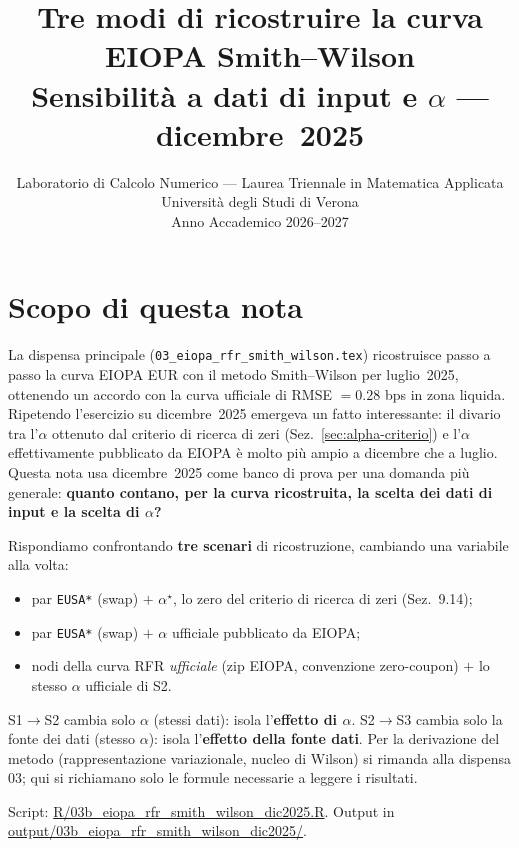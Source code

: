 \documentclass[11pt,a4paper]{article}
\title{%
  \textbf{Tre modi di ricostruire la curva EIOPA Smith--Wilson}\\[6pt]
  \large Sensibilit\`a a dati di input e $\alpha$ --- dicembre~2025\\[4pt]
}
\author{Laboratorio di Calcolo Numerico --- Laurea Triennale in Matematica Applicata\\
  Universit\`a degli Studi di Verona\\[2pt]
  Anno Accademico 2026--2027}
\date{}
\theoremstyle{remark}
\begin{document}
\maketitle

\section{Scopo di questa nota}

La dispensa principale (\texttt{03\_eiopa\_rfr\_smith\_wilson.tex}) ricostruisce passo a
passo la curva EIOPA EUR con il metodo Smith--Wilson per luglio~2025, ottenendo un accordo
con la curva ufficiale di RMSE $=0.28$ bps in zona liquida. Ripetendo l'esercizio su
dicembre~2025 emergeva un fatto interessante: il divario tra l'$\alpha$ ottenuto dal criterio
di ricerca di zeri (Sez.~\ref{sec:alpha-criterio}) e l'$\alpha$ effettivamente pubblicato da
EIOPA \`e molto pi\`u ampio a dicembre che a luglio. Questa nota usa dicembre~2025 come banco
di prova per una domanda pi\`u generale: \textbf{quanto contano, per la curva ricostruita, la
scelta dei dati di input e la scelta di $\alpha$?}

Rispondiamo confrontando \textbf{tre scenari} di ricostruzione, cambiando una variabile alla
volta:
\begin{itemize}
  \item[\textbf{S1}] par \texttt{EUSA*} (swap) $+$ $\alpha^\star$, lo zero del criterio di
        ricerca di zeri (Sez.~9.14);
  \item[\textbf{S2}] par \texttt{EUSA*} (swap) $+$ $\alpha$ ufficiale pubblicato da EIOPA;
  \item[\textbf{S3}] nodi della curva RFR \emph{ufficiale} (zip EIOPA, convenzione
        zero-coupon) $+$ lo stesso $\alpha$ ufficiale di S2.
\end{itemize}
S1$\to$S2 cambia solo $\alpha$ (stessi dati): isola l'\textbf{effetto di $\alpha$}. S2$\to$S3
cambia solo la fonte dei dati (stesso $\alpha$): isola l'\textbf{effetto della fonte dati}.
Per la derivazione del metodo (rappresentazione variazionale, nucleo di Wilson) si rimanda
alla dispensa 03; qui si richiamano solo le formule necessarie a leggere i risultati.

Script: \url{R/03b_eiopa_rfr_smith_wilson_dic2025.R}. Output in
\url{output/03b_eiopa_rfr_smith_wilson_dic2025/}.

\end{document}
